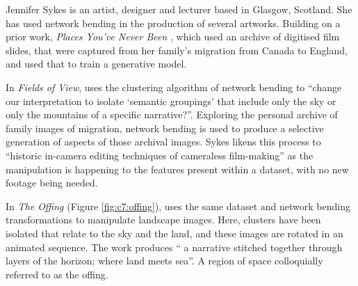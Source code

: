 Jennifer Sykes is an artist, designer and lecturer based in Glasgow, Scotland. 
She has used network bending in the production of several artworks. Building on a prior work, \textit{Places You’ve Never Been} \citep{sykes2018places}, which used an archive of digitised film slides, that were captured from her family's migration from Canada to England, and used that to train a generative model. 

In \textit{Fields of View}, \cite{sykes2021fields} uses the clustering algorithm of network bending to “change our interpretation to isolate ‘semantic groupings’ that include only the sky or only the mountains of a specific narrative?”. 
Exploring the personal archive of family images of migration, network bending is used to produce a selective generation of aspects of those archival images. 
Sykes likens this process to “historic in-camera editing techniques of cameraless film-making” as the manipulation is happening to the features present within a dataset, with no new footage being needed.

In \textit{The Offing} (Figure \ref{fig:c7:offing}), \cite{sykes2022offing} uses the same dataset and network bending transformations to manipulate landscape images. 
Here, clusters have been isolated that relate to the sky and the land, and these images are rotated in an animated sequence. 
The work produces “ a narrative stitched together through layers of the horizon; where land meets sea”. 
A region of space colloquially referred to as the offing. 

